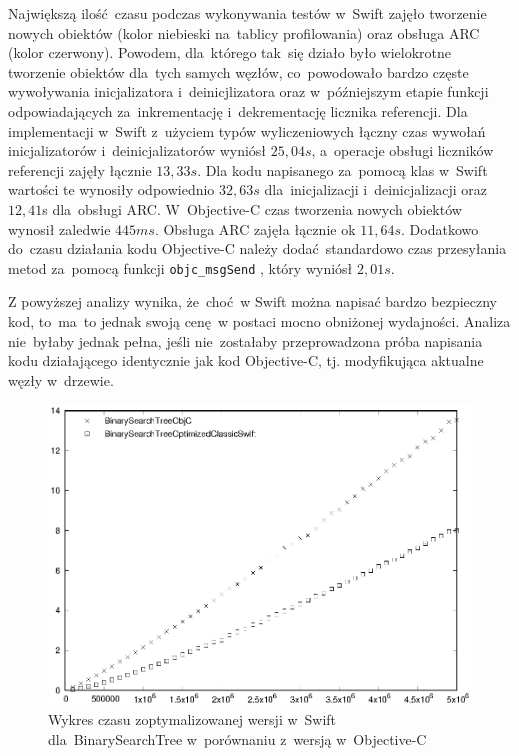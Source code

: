 \documentclass[mgr, shortabstract]{iithesis}
\newcommand{\objcinline}[1]{
    \texttt{#1}
}
\begin{document}
Największą ilość czasu podczas wykonywania testów w~Swift zajęło tworzenie nowych obiektów (kolor niebieski na~tablicy profilowania) oraz obsługa ARC (kolor czerwony). Powodem, dla~którego tak~się działo było wielokrotne tworzenie obiektów dla~tych samych węzłów, co~powodowało bardzo częste wywoływania inicjalizatora i~deinicjlizatora oraz w~późniejszym etapie funkcji odpowiadających za~inkrementację i~dekrementację licznika referencji. Dla implementacji w~Swift z~użyciem typów wyliczeniowych łączny czas wywołań inicjalizatorów i~deinicjalizatorów wyniósł $25,04s$, a~operacje obsługi liczników referencji zajęły łącznie $13,33s$. Dla kodu napisanego za~pomocą klas w~Swift wartości te wynosiły odpowiednio $32,63s$ dla~inicjalizacji i~deinicjalizacji oraz $12,41$s dla~obsługi ARC. W~Objective-C czas tworzenia nowych obiektów wynosił zaledwie $445ms$. Obsługa ARC zajęła łącznie ok $11,64s$. Dodatkowo do~czasu działania kodu Objective-C należy dodać standardowo czas przesyłania metod za~pomocą funkcji \objcinline{objc_msgSend}, który wyniósł $2,01s$.

Z powyższej analizy wynika, że~choć w Swift można napisać bardzo bezpieczny kod, to~ma~to jednak swoją cenę w postaci mocno obniżonej wydajności. Analiza nie~byłaby jednak pełna, jeśli nie~zostałaby przeprowadzona próba napisania kodu działającego identycznie jak kod Objective-C, tj. modyfikująca aktualne węzły w~drzewie. 

\begin{figure}
    \includegraphics{plots/BinarySearchTree2.eps}
    \caption{Wykres czasu zoptymalizowanej wersji w~Swift dla~BinarySearchTree w~porównaniu z~wersją w~Objective-C}
    \label{p:binary_search2}
\end{figure}
\end{document}

